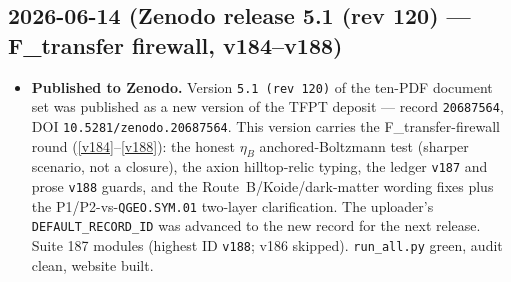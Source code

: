 \subsection*{2026-06-14 (Zenodo release 5.1 (rev 120) --- F\_transfer firewall, v184--v188)}
\begin{itemize}
\item \textbf{Published to Zenodo.} Version \texttt{5.1 (rev 120)} of the ten-PDF document set was
  published as a new version of the TFPT deposit --- record \texttt{20687564},
  DOI \texttt{10.5281/zenodo.20687564}. This version carries the F\_transfer-firewall round
  (\vref{v184}--\vref{v188}): the honest $\eta_B$ anchored-Boltzmann test (sharper scenario, not a
  closure), the axion hilltop-relic typing, the ledger \texttt{v187} and prose \texttt{v188} guards, and
  the Route~B/Koide/dark-matter wording fixes plus the P1/P2-vs-\texttt{QGEO.SYM.01} two-layer
  clarification. The uploader's \texttt{DEFAULT\_RECORD\_ID} was advanced to the new record for the next
  release. Suite 187 modules (highest ID \texttt{v188}; v186 skipped). \texttt{run\_all.py} green, audit
  clean, website built.
\end{itemize}

